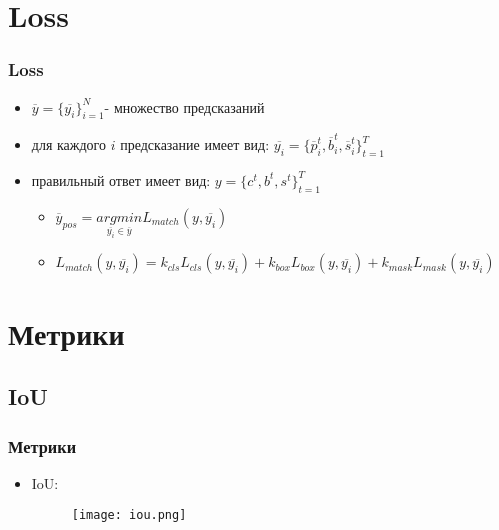 
\section{Loss}
\begin{frame}
    \frametitle{Loss}
    \begin{itemize}
        \item \(\overline{y}=\{\overline{y_i}\}_{i=1}^{N}\)- множество предсказаний
        \item для каждого \(i\)
        предсказание имеет вид: \(\overline{y_i}=\{\overline{p}^t_i,\overline{b}^t_i, \overline{s}^t_i\}_{t=1}^T\)
        \item правильный ответ имеет вид: \(y=\{c^t,b^t,s^t\}_{t=1}^T\) 
        \begin{itemize}
            \item \(\overline{y}_{pos} = \underset{\overline{y_i}\in\overline{y}}{argmin} L_{match}(y, \overline{y_i})\)
            \item \(L_{match}(y, \overline{y_i})=k_{cls}L_{cls}(y, \overline{y_i})+
            k_{box}L_{box}(y, \overline{y_i})+ k_{mask}L_{mask}(y, \overline{y_i})\)
        \end{itemize}
    \end{itemize}
\end{frame}

\section{Метрики}
\subsection{IoU}
\begin{frame}
    \frametitle{Метрики}
    \begin{itemize}
        \item IoU:
         \begin{figure}
            \texttt{[image: iou.png]}
        \end{figure}
        
    \end{itemize}
\end{frame}
